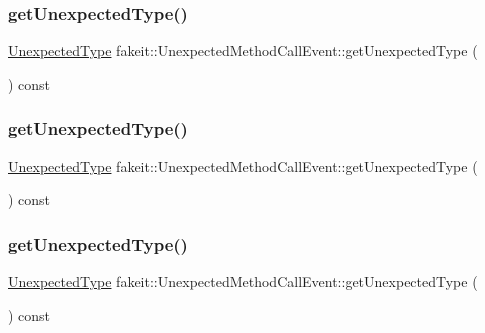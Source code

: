 \subsubsection{\texorpdfstring{getUnexpectedType()}{getUnexpectedType()}\hspace{0.1cm}{\footnotesize\ttfamily [2/9]}}
{\footnotesize\ttfamily \mbox{\hyperlink{namespacefakeit_ae284671dc00c0fa5ee2aa4a6af02743b}{Unexpected\+Type}} fakeit\+::\+Unexpected\+Method\+Call\+Event\+::get\+Unexpected\+Type (\begin{DoxyParamCaption}{ }\end{DoxyParamCaption}) const\hspace{0.3cm}{\ttfamily [inline]}}

\mbox{\label{structfakeit_1_1UnexpectedMethodCallEvent_a85b14cb613e543dff7e3c491f643ad7b}} 
\subsubsection{\texorpdfstring{getUnexpectedType()}{getUnexpectedType()}\hspace{0.1cm}{\footnotesize\ttfamily [3/9]}}
{\footnotesize\ttfamily \mbox{\hyperlink{namespacefakeit_ae284671dc00c0fa5ee2aa4a6af02743b}{Unexpected\+Type}} fakeit\+::\+Unexpected\+Method\+Call\+Event\+::get\+Unexpected\+Type (\begin{DoxyParamCaption}{ }\end{DoxyParamCaption}) const\hspace{0.3cm}{\ttfamily [inline]}}

\mbox{\label{structfakeit_1_1UnexpectedMethodCallEvent_a85b14cb613e543dff7e3c491f643ad7b}} 
\subsubsection{\texorpdfstring{getUnexpectedType()}{getUnexpectedType()}\hspace{0.1cm}{\footnotesize\ttfamily [4/9]}}
{\footnotesize\ttfamily \mbox{\hyperlink{namespacefakeit_ae284671dc00c0fa5ee2aa4a6af02743b}{Unexpected\+Type}} fakeit\+::\+Unexpected\+Method\+Call\+Event\+::get\+Unexpected\+Type (\begin{DoxyParamCaption}{ }\end{DoxyParamCaption}) const\hspace{0.3cm}{\ttfamily [inline]}}

